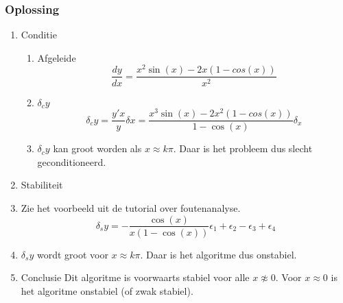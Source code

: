 \documentclass[10pt,a4paper]{article}
\begin{document}
\subsubsection{Oplossing}
\begin{enumerate}
\item Conditie
\begin{enumerate}
\item Afgeleide
\[
\frac{dy}{dx} = \frac{x^2\sin(x) - 2x(1-cos(x))}{x^2}
\]
\item $\delta_c y$
\[
\delta_c y = \frac{y'x}{y}\delta x = \frac{x^3\sin(x) - 2x^2(1-cos(x))}{1-\cos(x)}\delta_x
\]
\item $\delta_c y$ kan groot worden als $x\approx k\pi$. Daar is het probleem dus slecht geconditioneerd.
\end{enumerate}
\item Stabiliteit
\item
Zie het voorbeeld uit de tutorial over foutenanalyse.
\[
\delta_s y = -\frac{\cos(x)}{x(1-\cos(x))}\epsilon_1 + \epsilon_2 - \epsilon_3 + \epsilon_4
\]
\item $\delta_s y$ wordt groot voor $x \approx k\pi$. Daar is het algoritme dus onstabiel.
\item Conclusie
Dit algoritme is voorwaarts stabiel voor alle $x \not\approx 0$. Voor $x\approx 0$ is het algoritme onstabiel (of zwak stabiel).
\end{enumerate}
\end{document}
